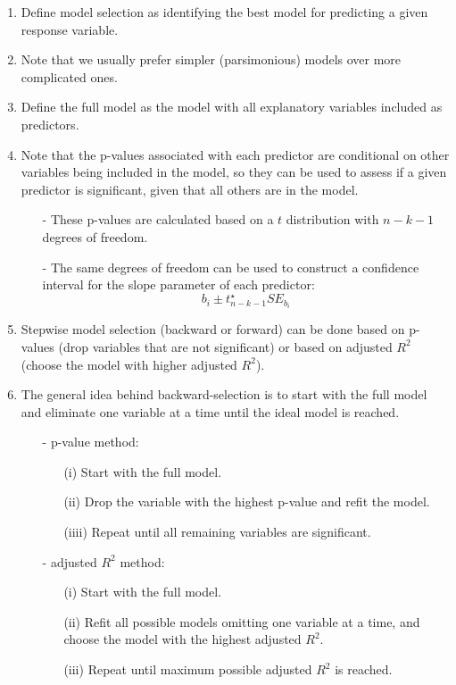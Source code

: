 \documentclass[11pt]{article}
\begin{document}
%
\begin{enumerate}[resume]
\renewcommand\labelenumi{\textcolor{light}{\textbf{LO \theenumi.}}}

\item Define model selection as identifying the best model for predicting a given response variable. 

\item Note that we usually prefer simpler (parsimonious) models over more complicated ones.

\item Define the full model as the model with all explanatory variables included as predictors.

\item Note that the p-values associated with each predictor are conditional on other variables being included in the model, so they can be used to assess if a given predictor is significant, given that all others are in the model.
\begin{itemize}
\item[-] These p-values are calculated based on a $t$ distribution with $n - k - 1$ degrees of freedom.
\item[-] The same degrees of freedom can be used to construct a confidence interval for the slope parameter of each predictor:
\[ b_i \pm t^\star_{n - k - 1} SE_{b_i} \]
\end{itemize}

\item Stepwise model selection (backward or forward) can be done based on p-values (drop variables that are not significant) or based on adjusted $R^2$ (choose the model with higher adjusted $R^2$).

\item The general idea behind backward-selection is to start with the full model and eliminate one variable at a time until the ideal model is reached.
\begin{itemize}
\item[-] p-value method: 
\begin{enumerate}
\item[(i)] Start with the full model.
\item[(ii)] Drop the variable with the highest p-value and refit the model.
\item[(iiii)] Repeat until all remaining variables are significant.
\end{enumerate}
\item[-] adjusted $R^2$ method:
 \begin{enumerate}
\item[(i)] Start with the full model.
\item[(ii)] Refit all possible models omitting one variable at a time, and choose the model with the highest adjusted $R^2$.
\item[(iii)] Repeat until maximum possible adjusted $R^2$ is reached.
\end{enumerate}
\end{itemize}


\end{enumerate}
\end{document}
